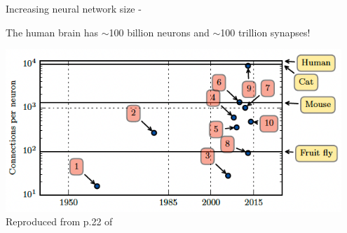 \begin{frame}[t,allowframebreaks]{Increasing neural network size - }



    The human brain has $\sim$100 billion neurons and $\sim$100 trillion synapses!

    \begin{center}
        \includegraphics[width=0.95\textwidth]
          {./images/dl_intro/nnet_size_connections_vs_time_01.png}\\
        {\scriptsize \color{col:attribution} 
        Reproduced from p.22 of \cite{Goodfellow:2017DL}}\\
    \end{center}

    \framebreak



\end{frame}
